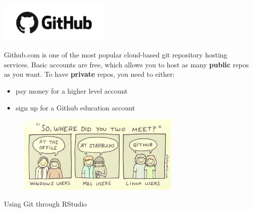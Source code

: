 \documentclass{beamer}
\begin{document}




\begin{frame}{\includegraphics[width=0.4\textwidth]{github}}

  Github.com is one of the most popular cloud-based git repository hosting
  services. Basic accounts are free, which allows you to host as many
  \textbf{public} repos as you want. To have \textbf{private} repos,
  you need to either:
  \begin{itemize}
  \item pay money for a higher level account
  \item sign up for a Github education account 
  \end{itemize}

  \pause

  \begin{figure}
    \centering
    \includegraphics[width=0.7\textwidth]{comic1}
  \end{figure}
  
\end{frame}

\begin{frame}{Using Git through RStudio}



\end{frame}
\end{document}
